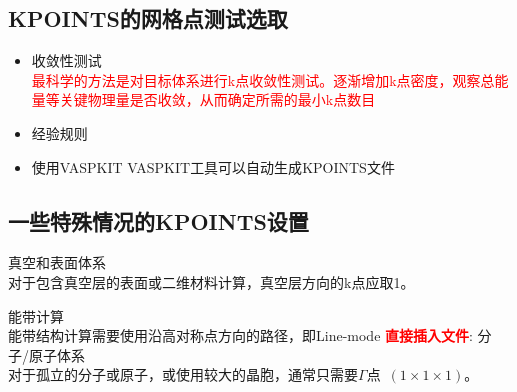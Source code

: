 \subsection{\rm{KPOINTS}的网格点测试选取}
\begin{itemize}
	\item 收敛性测试\\
		\textcolor{red}{最科学的方法是对目标体系进行k点收敛性测试。逐渐增加k点密度，观察总能量等关键物理量是否收敛，从而确定所需的最小k点数目}
	\item 经验规则\\

	\item 使用\textrm{VASPKIT}
		\textrm{VASPKIT}工具可以自动生成\textrm{KPOINTS}文件\\

\end{itemize}

\subsection{一些特殊情况的\rm{KPOINTS}设置}
真空和表面体系\\
对于包含真空层的表面或二维材料计算，真空层方向的k点应取1。%

能带计算\\
能带结构计算需要使用沿高对称点方向的路径，即\textrm{Line-mode}%
\textcolor{red}{\textbf{直接插入文件}}:
{\fontsize{9.2pt}{7.2pt}\selectfont{
}}
分子/原子体系\\
对于孤立的分子或原子，或使用较大的晶胞，通常只需要$\Gamma$点~$(1\times1\times1)$。

%
